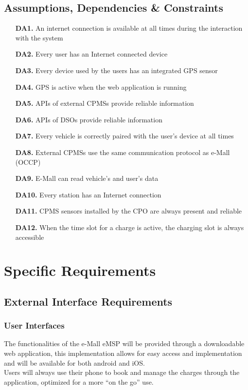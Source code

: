 \documentclass[12pt]{report}
\begin{document}
\section{Assumptions, Dependencies \& Constraints}
\begin{itemize}
    \item[\textbf{DA1.}]An internet connection is available at all times during the interaction with the system
    \item[\textbf{DA2.}]Every user has an Internet connected device
    \item[\textbf{DA3.}]Every device used by the users has an integrated GPS sensor
    \item[\textbf{DA4.}]GPS is active when the web application is running
    \item[\textbf{DA5.}] APIs of external CPMSs provide reliable information
    \item[\textbf{DA6.}] APIs of DSOs provide reliable information
    \item[\textbf{DA7.}]Every vehicle is correctly paired with the user’s device at all times
    \item[\textbf{DA8.}]External CPMSs use the same communication protocol as e-Mall (OCCP)
    \item[\textbf{DA9.}]E-Mall can read vehicle’s and user’s data
    \item[\textbf{DA10.}]Every station has an Internet connection
    \item[\textbf{DA11.}]CPMS sensors installed by the CPO are always present and reliable
    \item[\textbf{DA12.}]When the time slot for a charge is active, the charging slot is always accessible
\end{itemize}

\chapter{Specific Requirements}
\section{External Interface Requirements}
\subsection{User Interfaces}

The functionalities of the e-Mall eMSP will be provided through a downloadable web application, this implementation allows for easy access and implementation and will be available for both android and iOS.\\
Users will always use their phone to book and manage the charges through the application, optimized for a more “on the go” use.\\
\end{document}
